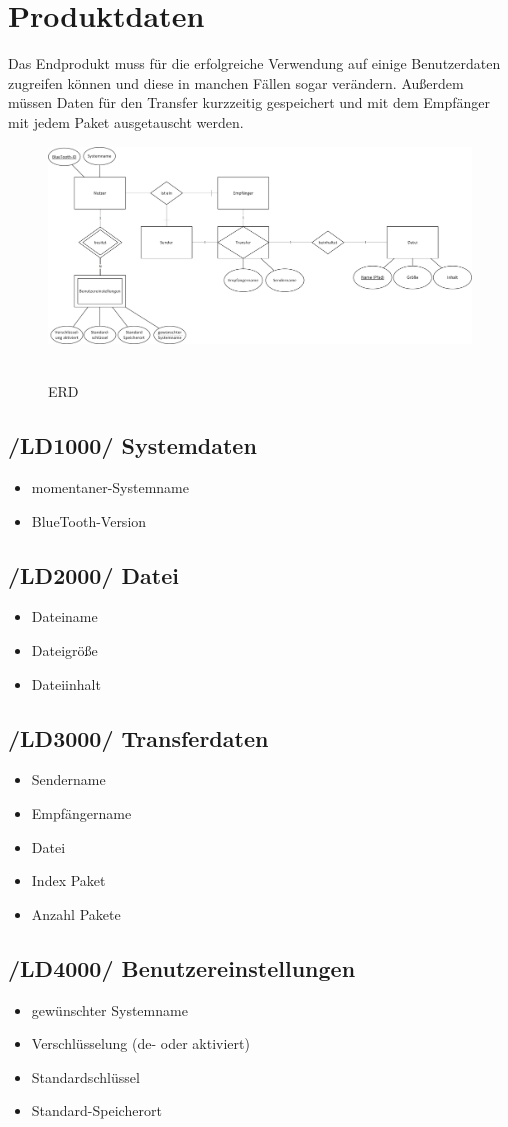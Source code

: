 \section{Produktdaten}
Das Endprodukt muss für die erfolgreiche Verwendung auf einige Benutzerdaten zugreifen können und diese in manchen Fällen sogar verändern. Außerdem müssen Daten für den Transfer kurzzeitig gespeichert und mit dem Empfänger mit jedem Paket ausgetauscht werden.
\\
\begin{figure}[H]
	\centering
	\includegraphics[width=\linewidth]{diagramms/erd/erd.png}\
	\caption{ERD}
\end{figure}
\newpage
\subsection{/LD1000/ Systemdaten}
\begin{itemize}
	\item momentaner-Systemname
	\item BlueTooth-Version
\end{itemize}
\subsection{/LD2000/ Datei}
\begin{itemize}
	\item Dateiname
	\item Dateigröße
	\item Dateiinhalt
\end{itemize}
\subsection{/LD3000/ Transferdaten}
\begin{itemize}
	\item Sendername
	\item Empfängername
	\item Datei
	\item Index Paket
	\item Anzahl Pakete
\end{itemize}
\subsection{/LD4000/ Benutzereinstellungen}
\begin{itemize}
	\item gewünschter Systemname
	\item Verschlüsselung (de- oder aktiviert)
	\item Standardschlüssel
	\item Standard-Speicherort
\end{itemize}